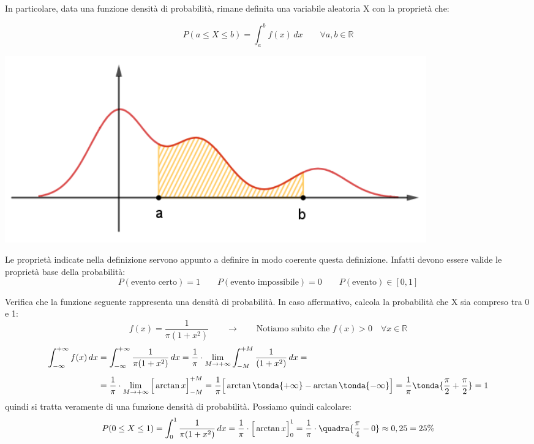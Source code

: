In particolare, data una funzione densità di probabilità, rimane definita una variabile aleatoria X con la proprietà che:\\
\begin{minipage}[c]{.5\textwidth}
\[P(a \leq X \leq b) = \int_a^b f(x)\,dx \qquad \forall a,b \in \mathbb{R}\]
\end{minipage}
\begin{minipage}[c]{.5\textwidth}
\begin{center}
  \includegraphics[width=0.8\textwidth]{img/Probabilita.png}
\end{center}
\end{minipage}


Le proprietà indicate nella definizione servono appunto a definire in modo coerente questa definizione. Infatti devono essere valide le proprietà base della probabilità:
\[P(\text{evento certo}) = 1 \qquad P(\text{evento impossibile}) = 0 \qquad P(\text{evento}) \in [0,1] \]

\begin{esempio}
Verifica che la funzione seguente rappresenta una densità di probabilità. In caso affermativo, calcola la probabilità che X sia compreso tra 0 e 1:\[f(x)= \dfrac{1}{\pi (1+x^2)} \qquad \longrightarrow \qquad \text{Notiamo subito che \(f(x)>0 \quad\forall x \in \mathbb{R}\)}\]
\[ \begin{split}\int_{-\infty}^{+\infty} f(x)\, dx &=\int_{-\infty}^{+\infty} \dfrac{1}{\pi (1+x^2)}\, dx = \dfrac{1}{\pi}\cdot \lim_{M \rightarrow +\infty} \int_{-M}^{+M} \dfrac{1}{ (1+x^2)}\, dx = \\[5pt]
&= \dfrac{1}{\pi}\cdot \lim_{M \rightarrow +\infty} \Big[\arctan{x}\Big]_{-M}^{+M} = \dfrac{1}{\pi} \Big[\arctan{\tonda{+\infty}}-\arctan{\tonda{-\infty}}\Big] = \dfrac{1}{\pi} \tonda{\dfrac{\pi}{2}+\dfrac{\pi}{2}} = 1 \end{split}\]
quindi si tratta veramente di una funzione densità di probabilità. Possiamo quindi calcolare:
\[P(0\leq X\leq 1)  = \int_0^1\dfrac{1}{\pi (1+x^2)}\, dx =  \dfrac{1}{\pi} \cdot \Big[\arctan{x}\Big]_{0}^1 = \dfrac{1}{\pi} \cdot \quadra{\dfrac{\pi}{4}-0} \approx 0,25 = 25 \%\]
\end{esempio}

